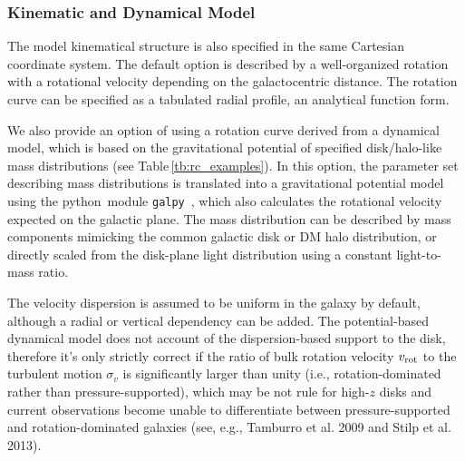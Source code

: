 \documentclass[twocolumn,tighten]{aastex62}
\newcommand{\python}{{\sc python}}
\newcommand{\galpy}{{\tt galpy}}
\begin{document}
\subsubsection{Kinematic and Dynamical Model}

The model kinematical structure is also specified in the same Cartesian coordinate system.
The default option is described by a well-organized rotation with a rotational velocity depending on the galactocentric distance.
The rotation curve can be specified as a tabulated radial profile, an analytical function form. 

We also provide an option of using a rotation curve derived from 
a dynamical model, which is based on the gravitational potential of specified disk/halo-like mass distributions (see Table\,\ref{tb:rc_examples}).
In this option, the parameter set describing mass distributions is translated into a gravitational potential model using the \python\ module \galpy\ \citep{Bovy:2015aa}, which also calculates the rotational velocity expected on the galactic plane.
The mass distribution can be described by mass components mimicking the common galactic disk or DM halo distribution, or directly scaled from the disk-plane light distribution using a constant light-to-mass ratio.

The velocity dispersion is assumed to be uniform in the galaxy by default, although a radial or vertical dependency can be added.
The potential-based dynamical model does not account of the dispersion-based support to the disk, therefore it's only strictly correct if the ratio of bulk rotation velocity $v_{\rm rot}$ to the turbulent motion $\sigma_{v}$ is significantly larger than unity (i.e., rotation-dominated rather than pressure-supported), which may be not rule for high-$z$ disks and current observations
become unable to differentiate between pressure-supported and
rotation-dominated galaxies (see, e.g., Tamburro et al. 2009
and Stilp et al. 2013).

%
\end{document}
